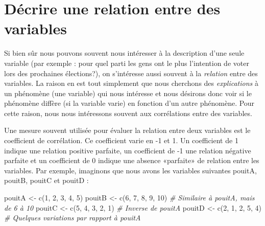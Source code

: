 \documentclass[
]{book}
\newenvironment{Shaded}{\begin{snugshade}}{\end{snugshade}}
\newcommand{\CommentTok}[1]{\textcolor[rgb]{0.56,0.35,0.01}{\textit{#1}}}
\newcommand{\DecValTok}[1]{\textcolor[rgb]{0.00,0.00,0.81}{#1}}
\newcommand{\FunctionTok}[1]{\textcolor[rgb]{0.00,0.00,0.00}{#1}}
\newcommand{\NormalTok}[1]{#1}
\newcommand{\OtherTok}[1]{\textcolor[rgb]{0.56,0.35,0.01}{#1}}
\begin{document}
\hypertarget{duxe9crire-une-relation-entre-des-variables}{%
\section{Décrire une relation entre des variables}\label{duxe9crire-une-relation-entre-des-variables}}

Si bien sûr nous pouvons souvent nous intéresser à la description d'une seule variable (par exemple : pour quel parti les gens ont le plus l'intention de voter lors des prochaines élections?), on s'intéresse aussi souvent à la \emph{relation} entre des variables. La raison en est tout simplement que nous cherchons des \emph{explications} à un phénomène (une variable) qui nous intéresse et nous désirons donc voir si le phénomène diffère (si la variable varie) en fonction d'un autre phénomène. Pour cette raison, nous nous intéressons souvent aux corrélations entre des variables.

Une mesure souvent utilisée pour évaluer la relation entre deux variables est le coefficient de corrélation. Ce coefficient varie en -1 et 1. Un coefficient de 1 indique une relation positive parfaite, un coefficient de -1 une relation négative parfaite et un coefficient de 0 indique une absence «parfaite» de relation entre les variables. Par exemple, imaginons que nous avons les variables suivantes pouitA, pouitB, pouitC et pouitD :

\begin{Shaded}
\begin{Highlighting}[]
\NormalTok{pouitA }\OtherTok{\textless{}{-}} \FunctionTok{c}\NormalTok{(}\DecValTok{1}\NormalTok{, }\DecValTok{2}\NormalTok{, }\DecValTok{3}\NormalTok{, }\DecValTok{4}\NormalTok{, }\DecValTok{5}\NormalTok{)}
\NormalTok{pouitB }\OtherTok{\textless{}{-}} \FunctionTok{c}\NormalTok{(}\DecValTok{6}\NormalTok{, }\DecValTok{7}\NormalTok{, }\DecValTok{8}\NormalTok{, }\DecValTok{9}\NormalTok{, }\DecValTok{10}\NormalTok{) }\CommentTok{\# Similaire à pouitA, mais de 6 à 10}
\NormalTok{pouitC }\OtherTok{\textless{}{-}} \FunctionTok{c}\NormalTok{(}\DecValTok{5}\NormalTok{, }\DecValTok{4}\NormalTok{, }\DecValTok{3}\NormalTok{, }\DecValTok{2}\NormalTok{, }\DecValTok{1}\NormalTok{) }\CommentTok{\# Inverse de pouitA}
\NormalTok{pouitD }\OtherTok{\textless{}{-}} \FunctionTok{c}\NormalTok{(}\DecValTok{2}\NormalTok{, }\DecValTok{1}\NormalTok{, }\DecValTok{2}\NormalTok{, }\DecValTok{5}\NormalTok{, }\DecValTok{4}\NormalTok{) }\CommentTok{\# Quelques variations par rapport à pouitA}
\end{Highlighting}
\end{Shaded}
\end{document}

